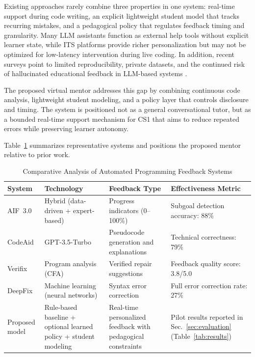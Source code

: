 \documentclass[conference]{IEEEtran}
\begin{document}
Existing approaches rarely combine three properties in one system: real-time support during code writing, an explicit lightweight student model that tracks recurring mistakes, and a pedagogical policy that regulates feedback timing and granularity. Many LLM assistants function as external help tools without explicit learner state, while ITS platforms provide richer personalization but may not be optimized for low-latency intervention during live coding. In addition, recent surveys point to limited reproducibility, private datasets, and the continued risk of hallucinated educational feedback in LLM-based systems \cite{NavigatingAutomatedFeedback}.

The proposed virtual mentor addresses this gap by combining continuous code analysis, lightweight student modeling, and a policy layer that controls disclosure and timing. The system is positioned not as a general conversational tutor, but as a bounded real-time support mechanism for CS1 that aims to reduce repeated errors while preserving learner autonomy.

Table~\ref{tab:feedback_comparison} summarizes representative systems and positions the proposed mentor relative to prior work.

\begin{table}[t]
\centering
\caption{Comparative Analysis of Automated Programming Feedback Systems}
\label{tab:feedback_comparison}
\renewcommand{\arraystretch}{1.2}
\begin{tabular}{p{2.6cm} p{3.6cm} p{4.6cm} p{3.8cm}}
\hline
\textbf{System} &
\textbf{Technology} &
\textbf{Feedback Type} &
\textbf{Effectiveness Metric} \\
\hline
AIF~3.0 \cite{AdaptiveImmediateFeedbackforBlockBasedProgramming} &
Hybrid (data-driven + expert-based) &
Progress indicators (0--100\%) &
Subgoal detection accuracy: 88\% \\

CodeAid \cite{CodeAid} &
GPT-3.5-Turbo &
Pseudocode generation and explanations &
Technical correctness: 79\% \\

Verifix \cite{NavigatingAutomatedFeedback} &
Program analysis (CFA) &
Verified repair suggestions &
Feedback quality score: 3.8/5.0 \\

DeepFix \cite{NavigatingAutomatedFeedback} &
Machine learning (neural networks) &
Syntax error correction &
Full error correction rate: 27\% \\

Proposed model &
Rule-based baseline + optional learned policy + student modeling &
Real-time personalized feedback with pedagogical constraints &
Pilot results reported in Sec.~\ref{sec:evaluation} (Table~\ref{tab:results}) \\
\hline
\end{tabular}
\end{table}
\end{document}

